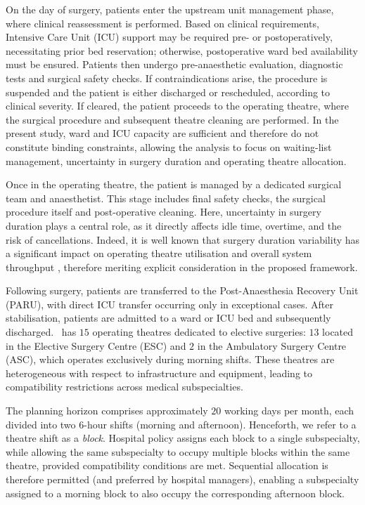On the day of surgery, patients enter the upstream unit management phase, where clinical reassessment is performed.
Based on clinical requirements, Intensive Care Unit (ICU) support may be required pre- or postoperatively, necessitating prior bed reservation; otherwise, postoperative ward bed availability must be ensured.
Patients then undergo pre-anaesthetic evaluation, diagnostic tests and surgical safety checks.
If contraindications arise, the procedure is suspended and the patient is either discharged or rescheduled, according to clinical severity.
If cleared, the patient proceeds to the operating theatre, where the surgical procedure and subsequent theatre cleaning are performed.
In the present study, ward and ICU capacity are sufficient and therefore do not constitute binding constraints, allowing the analysis to focus on waiting-list management, uncertainty in surgery duration and operating theatre allocation.

Once in the operating theatre, the patient is managed by a dedicated surgical team and anaesthetist. This stage includes final safety checks, the surgical procedure itself and post-operative cleaning. Here, uncertainty in surgery duration plays a central role, as it directly affects idle time, overtime, and the risk of cancellations. Indeed, it is well known that surgery duration variability has a significant impact on operating theatre utilisation and overall system throughput \citep[e.g.,][]{Pandit2011}, therefore meriting explicit consideration in the proposed framework.

Following surgery, patients are transferred to the Post-Anaesthesia Recovery Unit (PARU), with direct ICU transfer occurring only in exceptional cases. After stabilisation, patients are admitted to a ward or ICU bed and subsequently discharged. \hcunicamp~has $15$ operating theatres dedicated to elective surgeries: $13$ located in the Elective Surgery Centre (ESC) and $2$ in the Ambulatory Surgery Centre (ASC), which operates exclusively during morning shifts. These theatres are heterogeneous with respect to infrastructure and equipment, leading to compatibility restrictions across medical subspecialties.

The planning horizon comprises approximately $20$ working days per month, each divided into two $6$-hour shifts (morning and afternoon). Henceforth, we refer to a theatre shift as a \textit{block}.
Hospital policy assigns each block to a single subspecialty, while allowing the same subspecialty to occupy multiple blocks within the same theatre, provided compatibility conditions are met.
Sequential allocation is therefore permitted (and preferred by hospital managers), enabling a subspecialty assigned to a morning block to also occupy the corresponding afternoon block.

